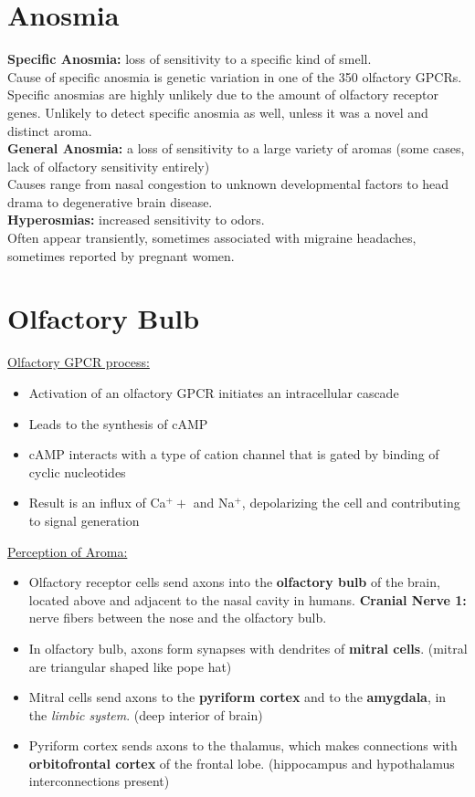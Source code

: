 \documentclass{article}
\begin{document}
\section{Anosmia}

\textbf{Specific Anosmia:} loss of sensitivity to a specific kind of smell. \\
Cause of specific anosmia is genetic variation in one of the 350 olfactory GPCRs. Specific anosmias are highly unlikely due to the amount of olfactory receptor genes. Unlikely to detect specific anosmia as well, unless it was a novel and distinct aroma. \\

\noindent \textbf{General Anosmia:} a loss of sensitivity to a large variety of aromas (some cases, lack of olfactory sensitivity entirely) \\
Causes range from nasal congestion to unknown developmental factors to head drama to degenerative brain disease. \\

\noindent \textbf{Hyperosmias:} increased sensitivity to odors. \\
Often appear transiently, sometimes associated with migraine headaches, sometimes reported by pregnant women. \\

\newpage
\section{Olfactory Bulb}

\noindent \underline{Olfactory GPCR process:}
\begin{itemize}
    \item Activation of an olfactory GPCR initiates an intracellular cascade
    \item Leads to the synthesis of cAMP
    \item cAMP interacts with a type of cation channel that is gated by binding of cyclic nucleotides 
    \item Result is an influx of Ca$^++$ and Na$^+$, depolarizing the cell and contributing to signal generation
\end{itemize}

\noindent \underline{Perception of Aroma:}
\begin{itemize}
    \item Olfactory receptor cells send axons into the \textbf{olfactory bulb} of the brain, located above and adjacent to the nasal cavity in humans. 
    \subitem \textbf{Cranial Nerve 1:} nerve fibers between the nose and the olfactory bulb. 
    \item In olfactory bulb, axons form synapses with dendrites of \textbf{mitral cells}. (mitral are triangular shaped like pope hat)
    \item Mitral cells send axons to the \textbf{pyriform cortex} and to the \textbf{amygdala}, in the \textit{limbic system}. (deep interior of brain)
    \item Pyriform cortex sends axons to the thalamus, which makes connections with \textbf{orbitofrontal cortex} of the frontal lobe. (hippocampus and hypothalamus interconnections present)
\end{itemize}
\end{document}

